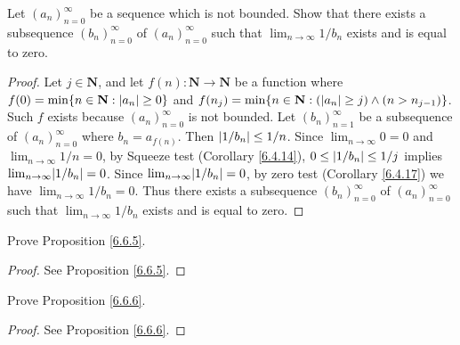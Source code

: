 \begin{exercise}\label{ex 6.6.3}
    Let \((a_n)_{n = 0}^\infty\) be a sequence which is not bounded.
    Show that there exists a subsequence \((b_n)_{n = 0}^\infty\) of \((a_n)_{n = 0}^\infty\) such that \(\lim_{n \to \infty} 1 / b_n\) exists and is equal to zero.
\end{exercise}

\begin{proof}
    Let \(j \in \mathbf{N}\), and let \(f(n) : \mathbf{N} \to \mathbf{N}\) be a function where \(f(0) = \min\{n \in \mathbf{N} : \abs*{a_n} \geq 0\}\) and \(f(n_j) = \min\{n \in \mathbf{N} : (\abs*{a_n} \geq j) \land (n > n_{j - 1})\}\).
    Such \(f\) exists because \((a_n)_{n = 0}^\infty\) is not bounded.
    Let \((b_n)_{n = 1}^\infty\) be a subsequence of \((a_n)_{n = 0}^\infty\) where \(b_n = a_{f(n)}\).
    Then \(\abs*{1 / b_n} \leq 1 / n\).
    Since \(\lim_{n \to \infty} 0 = 0\) and \(\lim_{n \to \infty} 1 / n = 0\), by Squeeze test (Corollary \ref{6.4.14}), \(0 \leq \abs*{1 / b_n} \leq 1 / j\) implies \(\lim_{n \to \infty} \abs*{1 / b_n} = 0\).
    Since \(\lim_{n \to \infty} \abs*{1 / b_n} = 0\), by zero test (Corollary \ref{6.4.17}) we have \(\lim_{n \to \infty} 1 / b_n = 0\).
    Thus there exists a subsequence \((b_n)_{n = 0}^\infty\) of \((a_n)_{n = 0}^\infty\) such that \(\lim_{n \to \infty} 1 / b_n\) exists and is equal to zero.
\end{proof}

\begin{exercise}\label{ex 6.6.4}
    Prove Proposition \ref{6.6.5}.
\end{exercise}

\begin{proof}
    See Proposition \ref{6.6.5}.
\end{proof}

\begin{exercise}\label{ex 6.6.5}
    Prove Proposition \ref{6.6.6}.
\end{exercise}

\begin{proof}
    See Proposition \ref{6.6.6}.
\end{proof}